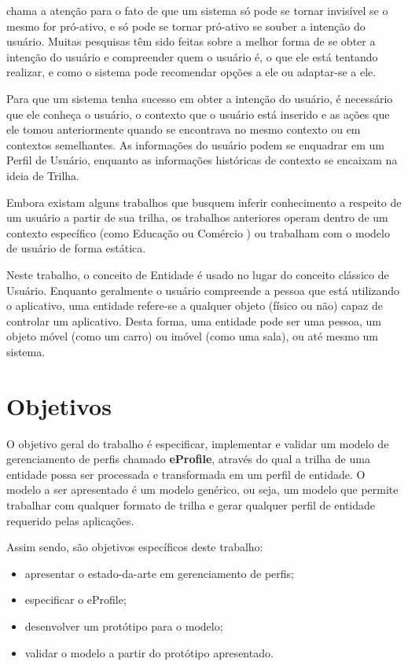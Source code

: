  chama a atenção para o fato de que um sistema só pode se tornar invisível se o mesmo for pró-ativo, e só pode se tornar pró-ativo se souber a intenção do usuário. Muitas pesquisas têm sido feitas sobre a melhor forma de se obter a intenção do usuário e compreender quem o usuário é, o que ele está tentando realizar, e como o sistema pode recomendar opções a ele ou adaptar-se a ele.

Para que um sistema tenha sucesso em obter a intenção do usuário, é necessário que ele conheça o usuário, o contexto que o usuário está inserido e as ações que ele tomou anteriormente quando se encontrava no mesmo contexto ou em contextos semelhantes. As informações do usuário podem se enquadrar em um Perfil de Usuário, enquanto as informações históricas de contexto se encaixam na ideia de Trilha.

Embora existam alguns trabalhos que busquem inferir conhecimento a respeito de um usuário a partir de sua trilha, os trabalhos anteriores operam dentro de um contexto específico (como Educação \cite{barbosa11} ou Comércio \cite{franco11}) ou trabalham com o modelo de usuário de forma estática.

Neste trabalho, o conceito de Entidade é usado no lugar do conceito clássico de Usuário. Enquanto geralmente o usuário compreende a pessoa que está utilizando o aplicativo, uma entidade refere-se a qualquer objeto (físico ou não) capaz de controlar um aplicativo. Desta forma, uma entidade pode ser uma pessoa, um objeto móvel (como um carro) ou imóvel (como uma sala), ou até mesmo um sistema.


\section{Objetivos}
\label{sec:objetivos}

O objetivo geral do trabalho é especificar, implementar e validar um modelo de gerenciamento de perfis chamado {\bf eProfile}, através do qual a trilha de uma entidade possa ser processada e transformada em um perfil de entidade. O modelo a ser apresentado é um modelo genérico, ou seja, um modelo que permite trabalhar com qualquer formato de trilha e gerar qualquer perfil de entidade requerido pelas aplicações.

Assim sendo, são objetivos específicos deste trabalho:

\begin{itemize}

  \item apresentar o estado-da-arte em gerenciamento de perfis;
  \item especificar o eProfile;
  \item desenvolver um protótipo para o modelo;
  \item validar o modelo a partir do protótipo apresentado.

\end{itemize}

